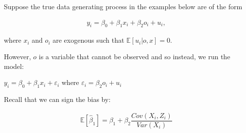 \documentclass[12pt]{exam}
\begin{document}
\selectfont

Suppose the true data generating process in the examples below are of the form 

\begin{align*}
    y_{i} = \beta_{0} + \beta_{1} x_{i} + \beta_{2} o_{i} + u_{i},
\end{align*}

where $x_{i}$ and $o_{i}$ are exogenous such that $\mathbb{E}[u_{i}|o,x] = 0$.

However, $o$ is a variable that cannot be observed and so instead, we run the model: 

$y_{i} = \beta_{0} + \beta_{1} x_{i} + \varepsilon_{i}$ where $\varepsilon_{i} = \beta_{2} o_{i} + u_{i}$

Recall that we can sign the bias by:

\begin{align*}
    \mathbb{E}[\hat{\beta}_{1}] = \beta_{1} + \beta_{2} \dfrac{Cov(X_{i},Z_{i})}{Var(X_{i})}
\end{align*}
\end{document}
